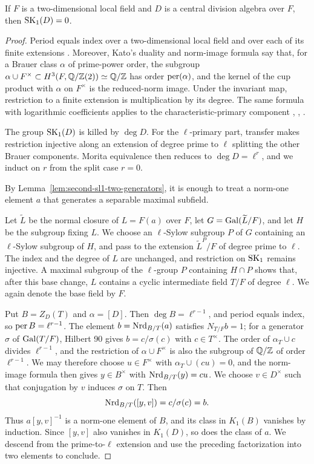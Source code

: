 \begin{corollary}
\label{cor:review-two-local-sk1-zero}
If $F$ is a two-dimensional local field and $D$ is a central division algebra over $F$, then $\operatorname{SK}_1(D)=0$.
\end{corollary}
\begin{proof}
Period equals index over a two-dimensional local field and over each of its finite extensions \cite[Corollary 5.1, Proposition 5.2]{Chipchakov2022}.
Moreover, Kato's duality and norm-image formula say that, for a Brauer class $\alpha$ of prime-power order, the subgroup $\alpha\cup F^\times\subset H^3(F,\mathbb Q/\mathbb Z(2))\simeq\mathbb Q/\mathbb Z$ has order $\operatorname{per}(\alpha)$, and the kernel of the cup product with $\alpha$ on $F^\times$ is the reduced-norm image.
Under the invariant map, restriction to a finite extension is multiplication by its degree.
The same formula with logarithmic coefficients applies to the characteristic-primary component \cite[\S3.1, Theorem 3(2)]{KatoLocalII}, \cite[Theorem 2]{KatoExistence}, \cite[Example 1.1(4)]{HuWu2020}.

The group $\operatorname{SK}_1(D)$ is killed by $\deg D$.
For the $\ell$-primary part, transfer makes restriction injective along an extension of degree prime to $\ell$ splitting the other Brauer components.
Morita equivalence then reduces to $\deg D=\ell^r$, and we induct on $r$ from the split case $r=0$.

By Lemma~\ref{lem:second-sl1-two-generators}, it is enough to treat a norm-one element $a$ that generates a separable maximal subfield.

Let $\widetilde L$ be the normal closure of $L=F(a)$ over $F$, let $G=\operatorname{Gal}(\widetilde L/F)$, and let $H$ be the subgroup fixing $L$.
We choose an $\ell$-Sylow subgroup $P$ of $G$ containing an $\ell$-Sylow subgroup of $H$, and pass to the extension $\widetilde L^P/F$ of degree prime to $\ell$.
The index and the degree of $L$ are unchanged, and restriction on $\operatorname{SK}_1$ remains injective.
A maximal subgroup of the $\ell$-group $P$ containing $H\cap P$ shows that, after this base change, $L$ contains a cyclic intermediate field $T/F$ of degree $\ell$.
We again denote the base field by $F$.

Put $B=Z_D(T)$ and $\alpha=[D]$.
Then $\deg B=\ell^{r-1}$, and period equals index, so $\operatorname{per} B=\ell^{r-1}$.
The element $b=\operatorname{Nrd}_{B/T}(a)$ satisfies $N_{T/F}b=1$; for a generator $\sigma$ of $\operatorname{Gal}(T/F)$, Hilbert 90 gives $b=c/\sigma(c)$ with $c\in T^\times$.
The order of $\alpha_T\cup c$ divides $\ell^{r-1}$, and the restriction of $\alpha\cup F^\times$ is also the subgroup of $\mathbb Q/\mathbb Z$ of order $\ell^{r-1}$.
We may therefore choose $u\in F^\times$ with $\alpha_T\cup(cu)=0$, and the norm-image formula then gives $y\in B^\times$ with $\operatorname{Nrd}_{B/T}(y)=cu$.
We choose $v\in D^\times$ such that conjugation by $v$ induces $\sigma$ on $T$.
Then
\[
 \operatorname{Nrd}_{B/T}([y,v])=c/\sigma(c)=b.
\]
Thus $a[y,v]^{-1}$ is a norm-one element of $B$, and its class in $K_1(B)$ vanishes by induction.
Since $[y,v]$ also vanishes in $K_1(D)$, so does the class of $a$.
We descend from the prime-to-$\ell$ extension and use the preceding factorization into two elements to conclude.
\end{proof}

